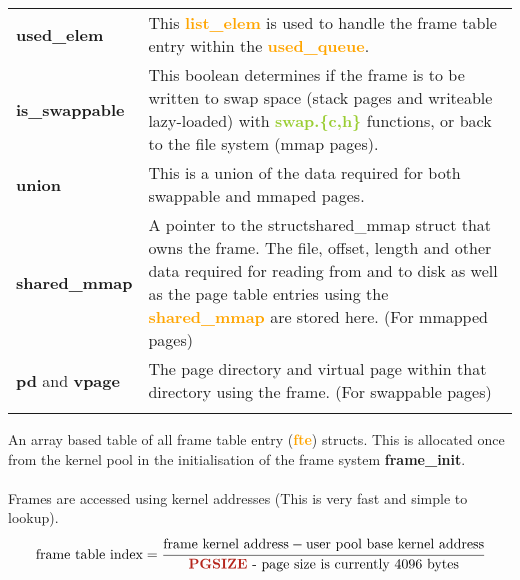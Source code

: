 \documentclass{report}
\newcommand{\fun}[1]{\textcolor{Emerald}{\textbf{#1}}}
\newcommand{\file}[1]{\textcolor{YellowGreen}{\textbf{#1}}}
\newcommand{\struct}[1]{\textcolor{orange}{\textbf{#1}}}
\newcommand{\var}[1]{\textcolor{RoyalPurple}{\textbf{#1}}}
\newcommand{\const}[1]{\textcolor{BrickRed}{\textbf{#1}}}
\newcommand{\pintoscode}[4]{}
\newcommand{\pintosfile}[3]{\pintoscode{#1}{#2}{\file{#3}}{#3}}
\begin{document}
				\pintosfile{11}{22}{frame.c}
				\begin{center}
					\begin{tabular}{l p{10cm}}
						\vspace*{2mm}
						\var{used\_elem} & This \struct{list\_elem} is used to handle the 
						frame table entry within the \struct{used\_queue}. \\ \vspace*{2mm}

						\var{is\_swappable}  & This boolean determines if the frame is to be written to 
						swap space (stack pages and writeable lazy-loaded) with \file{swap.\{c,h\}} 
						functions, or back to the file system (mmap pages). \\ \vspace*{2mm}

						\const{union}  & This is a union of the data required for both swappable 
						and mmaped pages.  \\ \vspace*{2mm}

						\var{shared\_mmap}  & A pointer to the 
						struct{shared\_mmap} struct that owns the frame. The file, offset, 
						length and other data required for reading from and to disk as well 
						as the page table entries using the \struct{shared\_mmap} are stored
						here. (For mmapped pages)
						\\ \vspace*{2mm}

						\var{pd} and \var{vpage}  & The page directory and virtual page 
						within that directory using the frame. (For swappable pages) 
						\\ \vspace*{2mm}
					\end{tabular}
				\end{center}
				
				\pintosfile{38}{38}{frame.c}
				An array based table of all frame table entry (\struct{fte}) structs. 
				This is allocated once from the kernel pool in the initialisation of the 
				frame system \fun{frame\_init}.
				\\
				\\ Frames are accessed using kernel addresses (This is very fast and 
				simple to lookup).
				\[\text{frame table index} = \cfrac{\text{frame kernel address} - 
				\text{user pool base kernel address}}{\text{\const{PGSIZE} - 
				page size is currently 4096 bytes}}\]
				
\end{document}
